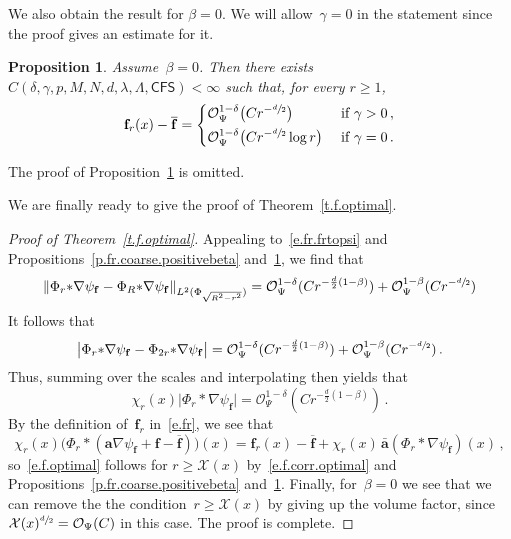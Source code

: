 \documentclass[11pt]{article} %
\numberwithin{equation}{section}
\newtheorem{proposition}[theorem]{Proposition}
\theoremstyle{definition}
\let\originalleft\left
\let\originalright\right
\renewcommand{\left}{\mathopen{}\mathclose\bgroup\originalleft}
\renewcommand{\right}{\aftergroup\egroup\originalright}
\newcommand{\f}{\mathbf{f}}
\renewcommand{\a}{\mathbf{a}}
\newcommand{\ahom}{\bar{\a}}
\newcommand{\X}{\mathcal{X}}
\renewcommand{\O}{\mathcal{O}}
\newcommand{\minscale}{\chi}
\newcommand{\CFS}{\mathsf{CFS}}
\begin{document}
We also obtain the result for $\beta=0$. We will allow~$\gamma=0$ in the statement since the proof gives an estimate for it. 

\begin{proposition}
\label{p.fr.coarse.zerobeta}
Assume~$\beta=0$. Then there exists~$C(\delta,\gamma,p,M,N,d,\lambda,\Lambda,\CFS) < \infty$ such that, for every $r \geq 1$, 
\begin{equation}
\label{e.fr.coarse.zerobeta}
\f_r(x) - \overline{\f} 
=
\left\{
\begin{aligned}
& \O_{\Psi}^{1-\delta} \bigl(C r^{-\sfrac d2}\bigr) & & \mbox{ if } \gamma>0
\, ,  
\\
& 
 \O_{\Psi}^{1-\delta} \bigl(C r^{-\sfrac d2} \log r\bigr) & & \mbox{ if } \gamma = 0
\, .
\end{aligned}
\right.
\end{equation}
\end{proposition}

The proof of Proposition~\ref{p.fr.coarse.zerobeta} is omitted. 

\smallskip

We are finally ready to give the proof of Theorem~\ref{t.f.optimal}. 


\begin{proof}[Proof of Theorem~\ref{t.f.optimal}]
Appealing to~\eqref{e.fr.frtopsi} and Propositions~\ref{p.fr.coarse.positivebeta} and~\ref{p.fr.coarse.zerobeta}, we find that
\begin{equation*}  
\left\| \Phi_r {\ast}  \nabla \psi_\f  - \Phi_R {\ast} \nabla \psi_\f  \right\|_{L^2 ( \Phi_{\sqrt{R^2-r^2}})}
= \O_{\Psi}^{1-\delta}(C r^{-\frac d2(1-\beta)}) + \O_{\Psi}^{1-\beta}(C r^{-\sfrac d2})
\end{equation*}
It follows that 
\begin{equation*}  
\bigl| \Phi_r {\ast}  \nabla \psi_\f   - \Phi_{2r} {\ast}  \nabla \psi_\f  \bigr|
= 
\O_{\Psi}^{1-\delta}(C r^{-\frac d2(1-\beta)}) + \O_{\Psi}^{1-\beta}(C r^{-\sfrac d2})\,.
\end{equation*}
Thus, summing over the scales and interpolating then yields that 
\begin{equation}  \label{e.f.corr.optimal}
\minscale_r(x)  \bigl| \Phi_r {\ast}  \nabla \psi_\f   \bigr| 
= 
\O_{\Psi}^{1-\delta}(C r^{-\frac d2(1-\beta)}) 
\,.
\end{equation}
By the definition of~$\f_r$ in~\eqref{e.fr}, we see that 
\begin{equation*}  
\minscale_r(x) \bigl( \Phi_r \ast (\a \nabla \psi_\f + \f - \overline{\f})\bigr) (x)
=
\f_r(x) -  \overline{\f} + \minscale_r(x) \, \ahom (\Phi_r \ast  \nabla \psi_\f)(x)
\,,
\end{equation*}
so~\eqref{e.f.optimal} follows for $r\geq \X(x)$ by~\eqref{e.f.corr.optimal} and Propositions~\ref{p.fr.coarse.positivebeta} and~\ref{p.fr.coarse.zerobeta}. Finally, for~$\beta = 0$ we see that we can remove the the condition~$r\geq \X(x)$ by giving up the volume factor, since~$\X(x)^{\sfrac d2} = \O_\Psi(C)$ in this case. The proof is complete. 
\end{proof}
\end{document}
